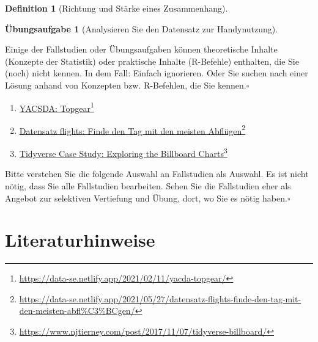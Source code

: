 \documentclass[
  a4paper,
  DIV=11]{scrreprt}
\providecommand{\tightlist}{%
  \setlength{\itemsep}{0pt}\setlength{\parskip}{0pt}}\usepackage{longtable,booktabs,array}
\theoremstyle{definition}
\newtheorem{exercise}{Übungsaufgabe}[chapter]
\theoremstyle{definition}
\theoremstyle{definition}
\newtheorem{definition}{Definition}[chapter]
\theoremstyle{remark}
\begin{document}
\begin{definition}[Richtung und Stärke eines
Zusammenhang]
\begin{exercise}[Analysieren Sie den Datensatz zur
Handynutzung]
\begin{tcolorbox}
Einige der Fallstudien oder Übungsaufgaben können theoretische Inhalte
(Konzepte der Statistik) oder praktische Inhalte (R-Befehle) enthalten,
die Sie (noch) nicht kennen. In dem Fall: Einfach ignorieren. Oder Sie
suchen nach einer Lösung anhand von Konzepten bzw. R-Befehlen, die Sie
kennen.\(\square\)

\end{tcolorbox}

\begin{enumerate}
\def\labelenumi{\arabic{enumi}.}
\setcounter{enumi}{1}
\tightlist
\item
  \href{https://data-se.netlify.app/2021/02/11/yacda-topgear/}{YACSDA:
  Topgear}\footnote{\url{https://data-se.netlify.app/2021/02/11/yacda-topgear/}}
\item
  \href{https://data-se.netlify.app/2021/05/27/datensatz-flights-finde-den-tag-mit-den-meisten-abfl\%C3\%BCgen/}{Datensatz
  flights: Finde den Tag mit den meisten Abflügen}\footnote{\url{https://data-se.netlify.app/2021/05/27/datensatz-flights-finde-den-tag-mit-den-meisten-abfl\%C3\%BCgen/}}
\item
  \href{https://www.njtierney.com/post/2017/11/07/tidyverse-billboard/}{Tidyverse
  Case Study: Exploring the Billboard Charts}\footnote{\url{https://www.njtierney.com/post/2017/11/07/tidyverse-billboard/}}
\end{enumerate}

\begin{tcolorbox}[enhanced jigsaw, leftrule=.75mm, opacitybacktitle=0.6, colback=white, colframe=quarto-callout-note-color-frame, coltitle=black, colbacktitle=quarto-callout-note-color!10!white, opacityback=0, left=2mm, breakable, titlerule=0mm, toptitle=1mm, bottomtitle=1mm, rightrule=.15mm, title=\textcolor{quarto-callout-note-color}{\faInfo}\hspace{0.5em}{Hinweis}, arc=.35mm, bottomrule=.15mm, toprule=.15mm]

Bitte verstehen Sie die folgende Auswahl an Fallstudien als Auswahl. Es
ist nicht nötig, dass Sie alle Fallstudien bearbeiten. Sehen Sie die
Fallstudien eher als Angebot zur selektiven Vertiefung und Übung, dort,
wo Sie es nötig haben.\(\square\)

\end{tcolorbox}

\section{Literaturhinweise}\label{literaturhinweise-6}


\end{exercise}
\end{definition}
\end{document}

